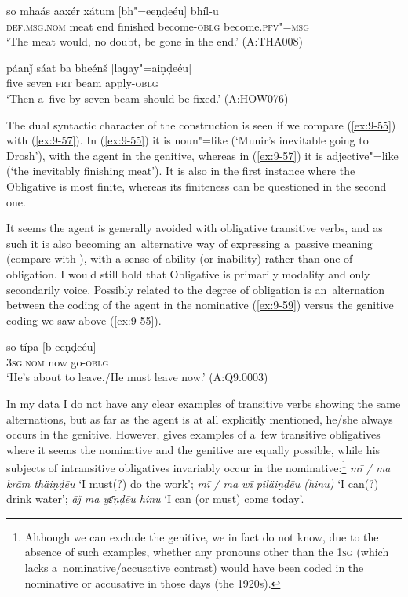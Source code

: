 \begin{exe}
\ex
\label{ex:9-57}
\gll so mhaás aaxér xátum [bh"=eeṇḍeéu] bhíl-u \\
\textsc{def.msg.nom} meat end finished become-\textsc{oblg} become.\textsc{pfv"=msg}  \\
\glt `The meat would, no doubt, be gone in the end.' (A:THA008)

\ex
\label{ex:9-58}
\gll páanǰ sáat ba bheénš [laɡay"=aiṇḍeéu] \\
five seven \textsc{prt} beam apply-\textsc{oblg} \\
\glt `Then a~five by seven beam should be fixed.' (A:HOW076)
\end{exe}

The dual syntactic character of the construction is seen if we compare (\ref{ex:9-55}) with (\ref{ex:9-57}). In (\ref{ex:9-55}) it is noun"=like (`Munir's inevitable going to Drosh'), with the agent in the genitive, whereas in (\ref{ex:9-57}) it is adjective"=like (`the inevitably finishing meat'). It is also in the first instance where the Obligative is most finite, whereas its finiteness can be questioned in the second one.


It seems the agent is generally avoided with obligative transitive verbs, and as such it is also becoming an~alternative way of expressing a~passive meaning (compare with ), with a sense of ability (or inability) rather than one of obligation. I would still hold that Obligative is primarily modality and only secondarily voice. Possibly related to the degree of obligation is an~alternation between the coding of the agent in the nominative (\ref{ex:9-59}) versus the genitive coding we saw above (\ref{ex:9-55}).

\begin{exe}
\ex
\label{ex:9-59}
\gll so típa [b-eeṇḍeéu] \\
\textsc{3sg.nom} now go-\textsc{oblg} \\
\glt `He's about to leave./He must leave now.' (A:Q9.0003)
\end{exe}

In my data I do not have any clear examples of transitive verbs showing the same alternations, but as far as the agent is at all explicitly mentioned, he/she always occurs in the genitive. However, \citet[24]{morgenstierne1941} gives examples of a~few transitive obligatives where it seems the nominative and the genitive are equally possible, while his subjects of intransitive obligatives invariably occur in the nominative:\footnote{Although we can exclude the genitive, we in fact do not know, due to the absence of such examples, whether any pronouns other than the \textsc{1sg} (which lacks a~nominative/accusative contrast) would have been coded in the nominative or accusative in those days (the 1920s).} \textit{mī / ma krām thäiṇḍēu} `I must(?) do the work'; \textit{mī / ma wī piläiṇḍēu (hinu)} `I can(?) drink water'; \textit{āǰ ma yɛ̄ṇḍēu hinu} `I can (or must) come today'.


